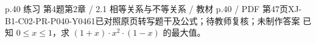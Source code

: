 \par\noindent\begin{minipage}{\linewidth}
\begin{bankitem}{p.40 练习 第4题}{第2章 / 2.1 相等关系与不等关系 / 教材 p.40 / PDF 第47页}{XJ-B1-C02-PR-P040-Y0461}{已对照原页转写题干及公式；待教师复核；未制作答案}
已知 $0\le x\le1$，求 $(1+x)\cdot x^2\cdot(1-x)$ 的最大值。
\end{bankitem}
\end{minipage}\par\medskip
